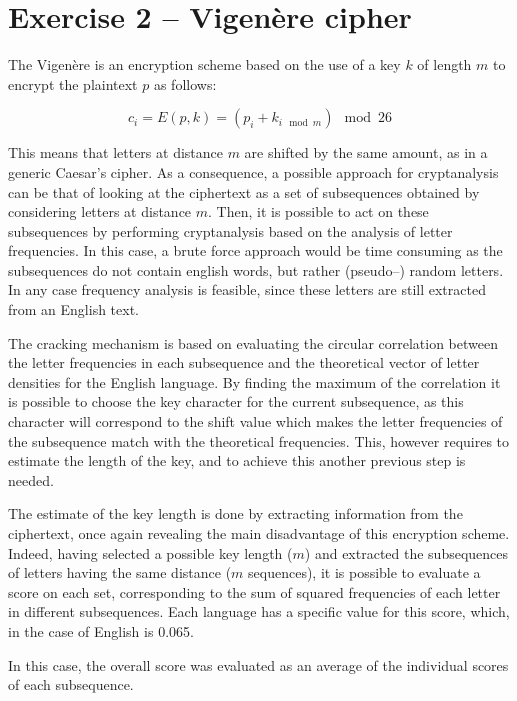 \documentclass[12pt]{article}
\begin{document}
\section{Exercise 2 – Vigenère cipher}

The Vigenère is an encryption scheme based on the use of a key $k$ of length $m$ to encrypt the plaintext $p$ as follows:

\begin{equation}
  c_i = E(p,k) = (p_i + k_{i\mod{m}})\mod{26}
\end{equation}

This means that letters at distance $m$ are shifted by the same amount, as in a generic Caesar's cipher.
As a consequence, a possible approach for cryptanalysis can be that of looking at the ciphertext as a set of subsequences obtained by considering letters at distance $m$. 
Then, it is possible to act on these subsequences by performing cryptanalysis based on the analysis of letter frequencies. In this case, a brute force approach would be time consuming as the subsequences do not contain english words, but rather (pseudo–) random letters. 
In any case frequency analysis is feasible, since these letters are still extracted from an English text.

The cracking mechanism is based on evaluating the circular correlation between the letter frequencies in each subsequence and the theoretical vector of letter densities for the English language. 
By finding the maximum of the correlation it is possible to choose the key character for the current subsequence, as this character will correspond to the shift value which makes the letter frequencies of the subsequence match with the theoretical frequencies.
This, however requires to estimate the length of the key, and to achieve this another previous step is needed.

The estimate of the key length is done by extracting information from the ciphertext, once again revealing the main disadvantage of this encryption scheme.
Indeed, having selected a possible key length ($m$) and extracted the subsequences of letters having the same distance ($m$ sequences), it is possible to evaluate a score on each set, corresponding to the sum of squared frequencies of each letter in different subsequences.
Each language has a specific value for this score, which, in the case of English is 0.065.

In this case, the overall score was evaluated as an average of the individual scores of each subsequence.
\end{document}
